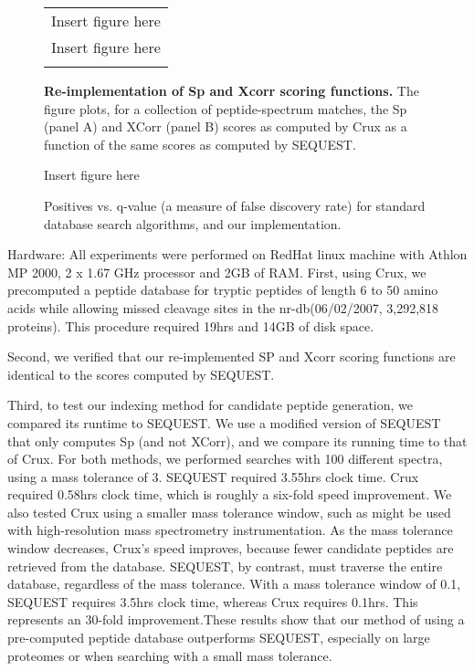 \documentclass{bioinfo}
\begin{document}
\begin{figure}
  \centering
  \begin{tabular}{c}
  Insert figure here \\
  Insert figure here \\
  \caption{{\bf Re-implementation of Sp and Xcorr scoring functions.}
  The figure plots, for a collection of peptide-spectrum matches, the
  Sp (panel A) and XCorr (panel B) scores as computed by Crux as a
  function of the same scores as computed by SEQUEST.
  \label{figure:indexing}}
  \end{tabular}
\end{figure}

\begin{figure}
  \centering
  Insert figure here
  \caption{Positives vs. q-value (a measure of false discovery rate) for
  standard database search algorithms, and our implementation.}
  \label{figure:indexing}
\end{figure}

Hardware: All experiments were performed on RedHat linux machine with
Athlon MP 2000, 2 x 1.67 GHz processor and 2GB of RAM.  First, using
Crux, we precomputed a peptide database for tryptic peptides of length
6 to 50 amino acids while allowing missed cleavage sites in the
nr-db(06/02/2007, 3,292,818 proteins). This procedure required 19hrs
and 14GB of disk space.

Second, we verified that our re-implemented SP and Xcorr scoring
functions are identical to the scores computed by SEQUEST.

Third, to test our indexing method for candidate peptide generation,
we compared its runtime to SEQUEST.  We use a modified version of
SEQUEST that only computes Sp (and not XCorr), and we compare its
running time to that of Crux.  For both methods, we performed searches
with 100 different spectra, using a mass tolerance of 3.  SEQUEST
required 3.55hrs clock time. Crux required 0.58hrs clock time, which
is roughly a six-fold speed improvement. We also tested Crux using a
smaller mass tolerance window, such as might be used with
high-resolution mass spectrometry instrumentation.  As the mass
tolerance window decreases, Crux's speed improves, because fewer
candidate peptides are retrieved from the database.  SEQUEST, by
contrast, must traverse the entire database, regardless of the mass
tolerance.  With a mass tolerance window of 0.1, SEQUEST requires
3.5hrs clock time, whereas Crux requires 0.1hrs.  This represents an
30-fold improvement.These results show that our method of using a
pre-computed peptide database outperforms SEQUEST, especially on large
proteomes or when searching with a small mass tolerance.
\end{document}
